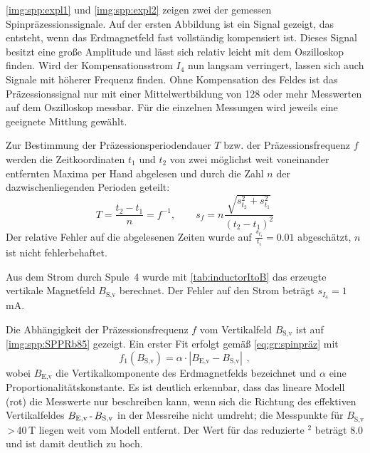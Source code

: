 \autoref{img:spp:expl1} und \autoref{img:spp:expl2} zeigen zwei der gemessen Spinpräzessionssignale.
Auf der ersten Abbildung ist ein Signal gezeigt, das entsteht, wenn das Erdmagnetfeld fast
vollständig kompensiert ist. Dieses Signal besitzt eine große Amplitude und lässt sich relativ leicht
mit dem Oszilloskop finden.
Wird der Kompensationsstrom $I_4$ nun langsam verringert, lassen sich auch Signale mit höherer Frequenz finden.
Ohne Kompensation des Feldes ist das Präzessionssignal
nur mit einer Mittelwertbildung von 128 oder mehr Messwerten
auf dem Oszilloskop messbar. Für die einzelnen Messungen wird jeweils eine geeignete Mittlung gewählt.

Zur Bestimmung der Präzessionsperiodendauer $T$ bzw. der
Präzessionsfrequenz $f$ werden die Zeitkoordinaten $t_1$ und $t_2$
von zwei möglichst weit voneinander entfernten Maxima per Hand abgelesen und durch
die Zahl $n$ der dazwischenliegenden Perioden geteilt:
\begin{equation}
  T=\frac{t_2-t_1}{n}=f^{-1}, \qquad s_f = n \frac{\sqrt{s_{t_2}^2 + s_{t_1}^2}}{ \left( t_2 -t_1 \right)^2 }
\end{equation}
Der relative Fehler auf die abgelesenen Zeiten wurde auf $\frac{s_{t_i}}{t_i}=0.01$ abgeschätzt,
$n$ ist nicht fehlerbehaftet.

Aus dem Strom durch Spule~4 wurde mit \autoref{tab:inductorItoB} das erzeugte vertikale Magnetfeld
$B_\text{S,v}$ berechnet. Der Fehler auf den Strom beträgt $s_{I_4}=1$\,mA.

Die Abhängigkeit der Präzessionsfrequenz $f$ vom Vertikalfeld $B_\text{S,v}$ ist auf
\autoref{img:spp:SPPRb85} gezeigt.
Ein erster Fit erfolgt gemäß \autoref{eq:gr:spinpräz} mit
\begin{equation}
  f_1(B_\text{S,v})=\alpha \cdot |B_\text{E,v}-B_\text{S,v}| \ \, ,
\end{equation}
wobei $B_\text{E,v}$ die Vertikalkomponente des Erdmagnetfelds bezeichnet und
$\alpha$ eine Proportionalitätskonstante.
Es ist deutlich erkennbar, dass das lineare Modell (rot) die Messwerte nur beschreiben kann,
wenn sich die Richtung des effektiven Vertikalfeldes
$B_\text{E,v} \text{\,-\,} B_\text{S,v}$ in der Messreihe nicht umdreht;
die Messpunkte für $B_\text{S,v}$\,>\,40\,\textmu T liegen weit vom Modell entfernt.
Der Wert für das reduzierte \textchi$^2$ beträgt 8.0 und ist damit deutlich zu hoch.

